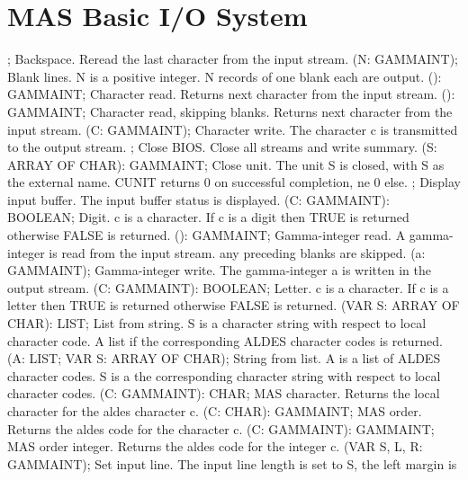 \section{ MAS Basic I/O System  } 
 ; \eproc
\bcom Backspace. Reread the last character from the input stream.  \ecom 
{} (N: GAMMAINT); \eproc
\bcom Blank lines. N is a positive integer. N records of one blank each
are output.  \ecom 
{} (): GAMMAINT; \eproc
\bcom Character read. Returns next character from the input stream.  \ecom 
{} (): GAMMAINT; \eproc
\bcom Character read, skipping blanks. Returns next character from the
input stream.  \ecom 
{} (C: GAMMAINT); \eproc
\bcom Character write. The character c is transmitted to the output
stream.  \ecom 
{} ; \eproc
\bcom Close BIOS. Close all streams and write summary.  \ecom 
{} (S: ARRAY OF CHAR): GAMMAINT; \eproc
\bcom Close unit. The unit S is closed, with S as the external name.
CUNIT returns 0 on successful completion, ne 0 else. \ecom 
{} ; \eproc
\bcom Display input buffer. The input buffer status is displayed. \ecom 
{} (C: GAMMAINT): BOOLEAN; \eproc
\bcom Digit. c is a character. If c is a digit then TRUE is returned
otherwise FALSE is returned.  \ecom 
{} (): GAMMAINT; \eproc
\bcom Gamma-integer read. A gamma-integer is read from the input
stream. any preceding blanks are skipped.  \ecom 
{} (a: GAMMAINT); \eproc
\bcom Gamma-integer write. The gamma-integer a is written in the output
stream. \ecom 
{} (C: GAMMAINT): BOOLEAN; \eproc
\bcom Letter. c is a character. If c is a letter then TRUE is returned
otherwise FALSE is returned.  \ecom 
{} (VAR S: ARRAY OF CHAR): LIST; \eproc
\bcom List from string. S is a character string with respect to local
character code. A list if the corresponding ALDES character codes
is returned. \ecom 
{} (A: LIST; VAR S: ARRAY OF CHAR); \eproc
\bcom String from list. A is a list of ALDES character codes.
S is a the corresponding character string with respect to local
character codes.  \ecom 
{} (C: GAMMAINT): CHAR; \eproc
\bcom MAS character. Returns the local character for the aldes character c.  \ecom 
{} (C: CHAR): GAMMAINT; \eproc
\bcom MAS order. Returns the aldes code for the character c.  \ecom 
{} (C: GAMMAINT): GAMMAINT; \eproc
\bcom MAS order integer. Returns the aldes code for the integer c. \ecom 
{} (VAR S, L, R: GAMMAINT); \eproc
\bcom Set input line. The input line length is set to S, the left margin is
